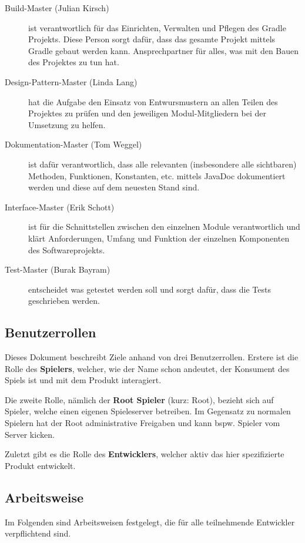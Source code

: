 \documentclass[a4paper]{scrreprt}
\begin{document}
\begin{description}
	\item[Build-Master (Julian Kirsch)] ist verantwortlich für das Einrichten, Verwalten und Pflegen des Gradle Projekts.
						 Diese Person sorgt dafür, dass das gesamte Projekt mittels Gradle gebaut werden kann.
						 Ansprechpartner für alles, was mit den Bauen des Projektes zu tun hat.
	\item[Design-Pattern-Master (Linda Lang)] hat die Aufgabe den Einsatz von Entwursmustern an allen Teilen des Projektes zu prüfen und den jeweiligen Modul-Mitgliedern bei der
							    Umsetzung zu helfen.
	\item[Dokumentation-Master (Tom Weggel)] ist dafür verantwortlich, dass alle relevanten (insbesondere alle sichtbaren) Methoden, Funktionen, Konstanten, etc. mittels JavaDoc
							       dokumentiert  werden und diese auf dem neuesten Stand sind.
	\item[Interface-Master (Erik Schott)] ist für die Schnittstellen zwischen den einzelnen Module verantwortlich und klärt Anforderungen, Umfang und Funktion der einzelnen Komponenten
						      des Softwareprojekts.
	\item[Test-Master (Burak Bayram)] entscheidet was getestet werden soll und sorgt dafür, dass die Tests geschrieben werden.
\end{description}

\subsection{Benutzerrollen}

Dieses Dokument beschreibt Ziele anhand von drei Benutzerrollen. Erstere ist die Rolle des \textbf{Spielers}, welcher, wie der Name schon andeutet, der Konsument des Spiels ist und mit dem
Produkt interagiert.

Die zweite Rolle, nämlich der \textbf{Root Spieler} (kurz: Root), bezieht sich auf Spieler, welche einen eigenen Spieleserver betreiben. Im Gegensatz zu normalen Spielern hat der Root administrative Freigaben und kann bspw. Spieler vom Server \glqq kicken\grqq{}.

Zuletzt gibt es die Rolle des \textbf{Entwicklers}, welcher aktiv das hier spezifizierte Produkt entwickelt.

\subsection{Arbeitsweise}
Im Folgenden sind Arbeitsweisen festgelegt, die für alle teilnehmende Entwickler verpflichtend sind.
\end{document}
